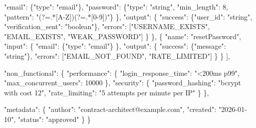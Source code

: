 \documentclass[
]{article}
\newenvironment{Shaded}{}{}
\newcommand{\DataTypeTok}[1]{\textcolor[rgb]{0.56,0.13,0.00}{#1}}
\newcommand{\DecValTok}[1]{\textcolor[rgb]{0.25,0.63,0.44}{#1}}
\newcommand{\FunctionTok}[1]{\textcolor[rgb]{0.02,0.16,0.49}{#1}}
\newcommand{\OtherTok}[1]{\textcolor[rgb]{0.00,0.44,0.13}{#1}}
\newcommand{\StringTok}[1]{\textcolor[rgb]{0.25,0.44,0.63}{#1}}
\begin{document}
\begin{Shaded}
\begin{Highlighting}[]
        \DataTypeTok{"email"}\FunctionTok{:} \FunctionTok{\{}\DataTypeTok{"type"}\FunctionTok{:} \StringTok{"email"}\FunctionTok{\},}
        \DataTypeTok{"password"}\FunctionTok{:} \FunctionTok{\{}\DataTypeTok{"type"}\FunctionTok{:} \StringTok{"string"}\FunctionTok{,} \DataTypeTok{"min\_length"}\FunctionTok{:} \DecValTok{8}\FunctionTok{,} \DataTypeTok{"pattern"}\FunctionTok{:} \StringTok{"(?=.*[A{-}Z])(?=.*[0{-}9])"}\FunctionTok{\}}
      \FunctionTok{\},}
      \DataTypeTok{"output"}\FunctionTok{:} \FunctionTok{\{}
        \DataTypeTok{"success"}\FunctionTok{:} \FunctionTok{\{}\DataTypeTok{"user\_id"}\FunctionTok{:} \StringTok{"string"}\FunctionTok{,} \DataTypeTok{"verification\_sent"}\FunctionTok{:} \StringTok{"boolean"}\FunctionTok{\},}
        \DataTypeTok{"errors"}\FunctionTok{:} \OtherTok{[}\StringTok{"USERNAME\_EXISTS"}\OtherTok{,} \StringTok{"EMAIL\_EXISTS"}\OtherTok{,} \StringTok{"WEAK\_PASSWORD"}\OtherTok{]}
      \FunctionTok{\}}
    \FunctionTok{\}}\OtherTok{,}
    \FunctionTok{\{}
      \DataTypeTok{"name"}\FunctionTok{:} \StringTok{"resetPassword"}\FunctionTok{,}
      \DataTypeTok{"input"}\FunctionTok{:} \FunctionTok{\{}
        \DataTypeTok{"email"}\FunctionTok{:} \FunctionTok{\{}\DataTypeTok{"type"}\FunctionTok{:} \StringTok{"email"}\FunctionTok{\}}
      \FunctionTok{\},}
      \DataTypeTok{"output"}\FunctionTok{:} \FunctionTok{\{}
        \DataTypeTok{"success"}\FunctionTok{:} \FunctionTok{\{}\DataTypeTok{"message"}\FunctionTok{:} \StringTok{"string"}\FunctionTok{\},}
        \DataTypeTok{"errors"}\FunctionTok{:} \OtherTok{[}\StringTok{"EMAIL\_NOT\_FOUND"}\OtherTok{,} \StringTok{"RATE\_LIMITED"}\OtherTok{]}
      \FunctionTok{\}}
    \FunctionTok{\}}
  \OtherTok{]}\FunctionTok{,}
  
  \DataTypeTok{"non\_functional"}\FunctionTok{:} \FunctionTok{\{}
    \DataTypeTok{"performance"}\FunctionTok{:} \FunctionTok{\{}
      \DataTypeTok{"login\_response\_time"}\FunctionTok{:} \StringTok{"\textless{}200ms p99"}\FunctionTok{,}
      \DataTypeTok{"max\_concurrent\_users"}\FunctionTok{:} \DecValTok{10000}
    \FunctionTok{\},}
    \DataTypeTok{"security"}\FunctionTok{:} \FunctionTok{\{}
      \DataTypeTok{"password\_hashing"}\FunctionTok{:} \StringTok{"bcrypt with cost 12"}\FunctionTok{,}
      \DataTypeTok{"rate\_limiting"}\FunctionTok{:} \StringTok{"5 attempts per minute per IP"}
    \FunctionTok{\}}
  \FunctionTok{\},}
  
  \DataTypeTok{"metadata"}\FunctionTok{:} \FunctionTok{\{}
    \DataTypeTok{"author"}\FunctionTok{:} \StringTok{"contract{-}architect@example.com"}\FunctionTok{,}
    \DataTypeTok{"created"}\FunctionTok{:} \StringTok{"2026{-}01{-}10"}\FunctionTok{,}
    \DataTypeTok{"status"}\FunctionTok{:} \StringTok{"approved"}
  \FunctionTok{\}}
\FunctionTok{\}}
\end{Highlighting}
\end{Shaded}
\end{document}
